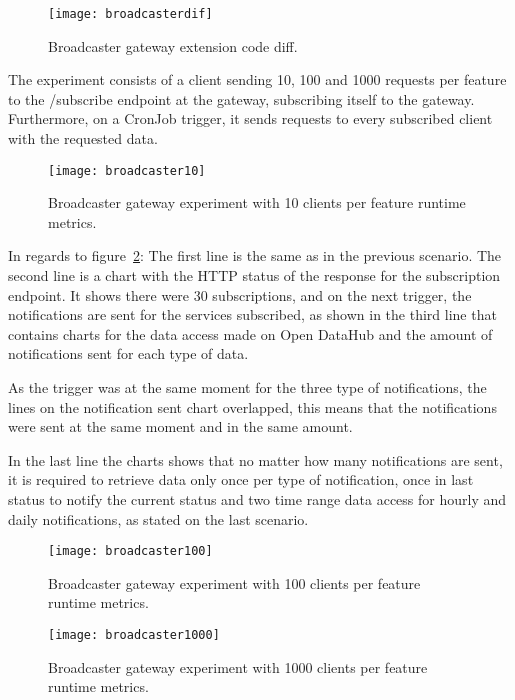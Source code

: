 \begin{figure}
    \centering
    \texttt{[image: broadcasterdif]}
    \caption{Broadcaster gateway extension code diff.\label{fig:broadcasterdif}}
\end{figure}

The experiment consists of a client sending 10, 100 and 1000 requests per feature to the /subscribe endpoint at the gateway, subscribing itself to the gateway. Furthermore, on a CronJob trigger, it sends requests to every subscribed client with the requested data.

\begin{figure}
    \centering
    \texttt{[image: broadcaster10]}
    \caption{Broadcaster gateway experiment with 10 clients per feature runtime metrics.\label{fig:broadcaster10}}
\end{figure}

In regards to figure~\ref{fig:broadcaster10}: The first line is the same as in the previous scenario. The second line is a chart with the HTTP status of the response for the subscription endpoint. It shows there were 30 subscriptions, and on the next trigger, the notifications are sent for the services subscribed, as shown in the third line that contains charts for the data access made on Open DataHub and the amount of notifications sent for each type of data.

As the trigger was at the same moment for the three type of notifications, the lines on the notification sent chart overlapped, this means that the notifications were sent at the same moment and in the same amount.

In the last line the charts shows that no matter how many notifications are sent, it is required to retrieve data only once per type of notification, once in last status to notify the current status and two time range data access for hourly and daily notifications, as stated on the last scenario.

\begin{figure}
    \centering
    \texttt{[image: broadcaster100]}
    \caption{Broadcaster gateway experiment with 100 clients per feature runtime metrics.\label{fig:broadcaster100}}
\end{figure}

\begin{figure}
    \centering
    \texttt{[image: broadcaster1000]}
    \caption{Broadcaster gateway experiment with 1000 clients per feature runtime metrics.\label{fig:broadcaster1000}}
\end{figure}


